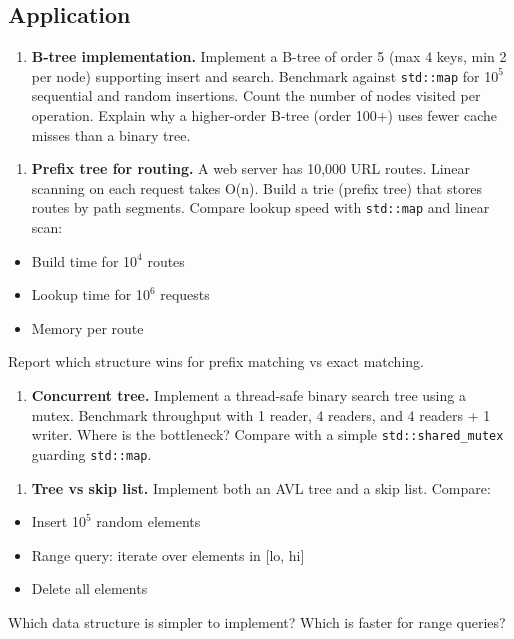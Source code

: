 \subsection{Application}

\begin{enumerate}
\item \textbf{B-tree implementation.} Implement a B-tree of order 5 (max 4 keys, min 2 per node) supporting insert and search. Benchmark against \texttt{std::map} for 1$0^{5}$ sequential and random insertions. Count the number of nodes visited per operation. Explain why a higher-order B-tree (order 100+) uses fewer cache misses than a binary tree.
\end{enumerate}

\begin{enumerate}
\item \textbf{Prefix tree for routing.} A web server has 10,000 URL routes. Linear scanning on each request takes O(n). Build a trie (prefix tree) that stores routes by path segments. Compare lookup speed with \texttt{std::map} and linear scan:
\end{enumerate}
\begin{itemize}
\item Build time for 1$0^{4}$ routes
\item Lookup time for 1$0^{6}$ requests
\item Memory per route
\end{itemize}
   Report which structure wins for prefix matching vs exact matching.

\begin{enumerate}
\item \textbf{Concurrent tree.} Implement a thread-safe binary search tree using a mutex. Benchmark throughput with 1 reader, 4 readers, and 4 readers + 1 writer. Where is the bottleneck? Compare with a simple \texttt{std::shared\_mutex} guarding \texttt{std::map}.
\end{enumerate}

\begin{enumerate}
\item \textbf{Tree vs skip list.} Implement both an AVL tree and a skip list. Compare:
\end{enumerate}
\begin{itemize}
\item Insert 1$0^{5}$ random elements
\item Range query: iterate over elements in [lo, hi]
\item Delete all elements
\end{itemize}
   Which data structure is simpler to implement? Which is faster for range queries?

